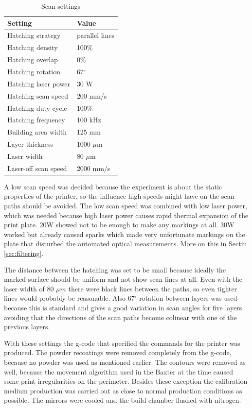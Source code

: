\begin{table}[h]
\centering
    \begin{tabular}{l|l}
        \textbf{Setting} & \textbf{Value} \\ \hline
        Hatching strategy & parallel lines \\
        Hatching density & 100\% \\
        Hatching overlap & 0\% \\
        Hatching rotation & 67$^\circ$ \\
        Hatching laser power & 30 W \\
        Hatching scan speed & 200 mm/s \\
        Hatching duty cycle & 100\% \\
        Hatching frequency & 100 kHz \\
        Building area width & 125 mm \\
        Layer thickness & 1000 $\mu$m\\
        Laser width & 80 $\mu$m\\
        Laser-off scan speed & 2000 mm/s
    \end{tabular}
    \caption{Scan settings}
    \label{tab:scan-settings}
\end{table}

A low scan speed was decided because the experiment is about the static properties of the printer, so the influence high speeds might have on the scan paths should be avoided. The low scan speed was combined with low laser power, which was needed because high laser power causes rapid thermal expansion of the print plate. 20W showed not to be enough to make any markings at all. 30W worked but already caused sparks which made very unfortunate markings on the plate that disturbed the automated optical measurements. More on this in Sectin \ref{sec:filtering}.

The distance between the hatching was set to be small because ideally the marked surface should be uniform and not show scan lines at all. Even with the laser width of 80 $\mu m$ there were black lines between the paths, so even tighter lines would probably be reasonable.
Also 67$^\circ$ rotation between layers was used because this is standard and gives a good variation in scan angles for five layers avoiding that the directions of the scan paths become colinear with one of the previous layers.

With these settings the g-code that specified the commands for the printer was produced. The powder recoatings were removed completely from the g-code, because no powder was used as mentioned earlier. The contours were removed as well, because the movement algorithm used in the Baxter at the time caused some print-irregularities on the perimeter. Besides these exception the calibration medium production was carried out as close to normal production conditions as possible. The mirrors were cooled and the build chamber flushed with nitrogen.

